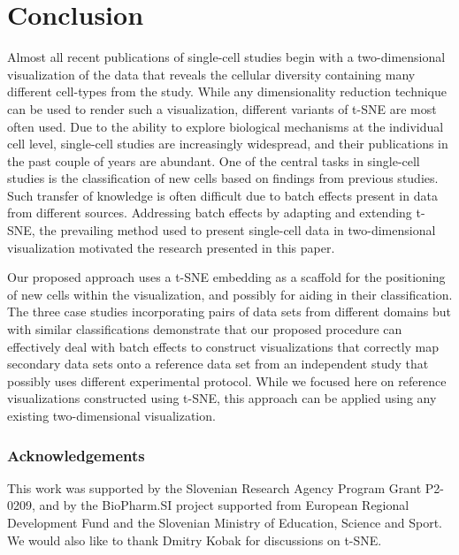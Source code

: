 \documentclass[runningheads]{llncs}
\begin{document}
\section{Conclusion}

Almost all recent publications of single-cell studies begin with a
two-dimensional visualization of the data that reveals the cellular diversity containing many 
different cell-types from the study. While any dimensionality reduction
technique can be used to render such a visualization, different variants of
t-SNE are most often used. Due to the ability to explore biological mechanisms
at the individual cell level, single-cell studies are increasingly widespread, and
their publications in the past couple of years are abundant. One of the central
tasks in single-cell studies is the classification of new cells based on
findings from previous studies. Such transfer of knowledge is often difficult
due to batch effects present in data from different sources.
Addressing batch effects by adapting and extending t-SNE, the prevailing method used
to present single-cell data in two-dimensional visualization motivated the research
presented in this paper. 

Our proposed approach uses a t-SNE embedding as a scaffold for the positioning of
new cells within the visualization, and possibly for aiding in their
classification. The three case studies incorporating pairs of data sets from
different domains but with similar classifications demonstrate that our
proposed procedure can effectively deal with batch effects to construct
visualizations that correctly map secondary data sets onto a reference data
set from an independent study that possibly uses different experimental
protocol. While we focused here on reference visualizations constructed using t-SNE,
this approach can be applied using any existing two-dimensional visualization.

\subsubsection*{Acknowledgements}

This work was supported by the Slovenian Research Agency Program Grant P2-0209,
and by the BioPharm.SI project supported from European Regional Development
Fund and the Slovenian Ministry of Education, Science and Sport. We would also
like to thank Dmitry Kobak for discussions on t-SNE.



\end{document}
